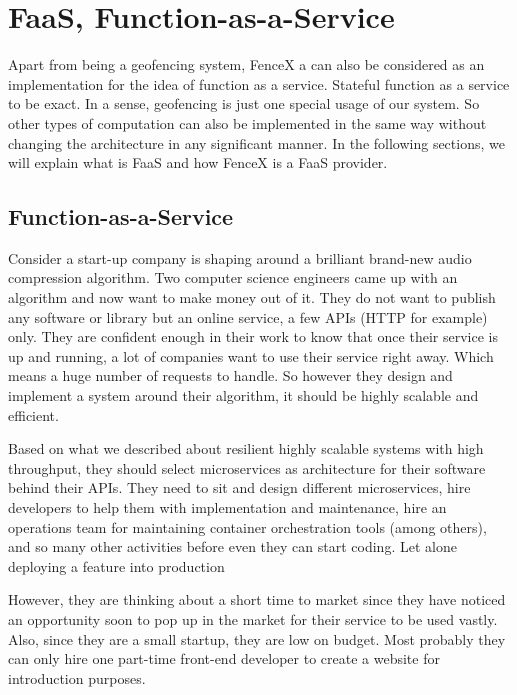 \documentclass[a4]{report}
\begin{document}
    \chapter{FaaS, Function-as-a-Service}
    Apart from being a geofencing system, FenceX a can also be considered as an implementation for the idea of function as
    a service\cite{whatisfaas}.
    Stateful function as a service to be exact.
    In a sense, geofencing is just one special usage of our system.
    So other types of computation can also be implemented in the same way without changing the architecture in any significant manner.
    In the following sections, we will explain what is FaaS and how FenceX is a FaaS provider.


    \section{Function-as-a-Service}
    Consider a start-up company is shaping around a brilliant brand-new audio compression algorithm.
    Two computer science engineers came up with an algorithm and now want to make money out of it.
    They do not want to publish any software or library but an online service, a few APIs (HTTP for example) only.
    They are confident enough in their work to know that once their service is up and running, a lot of companies want to use their service right away.
    Which means a huge number of requests to handle.
    So however they design and implement a system around their algorithm, it should be highly scalable and efficient.

    Based on what we described about resilient highly scalable systems with high throughput, they should select
    microservices as architecture for their software behind their APIs.
    They need to sit and design different microservices, hire developers to help them with implementation and
    maintenance, hire an operations team for maintaining container orchestration tools (among others), and so many
    other activities before even they can start coding.
    Let alone deploying a feature into production

    However, they are thinking about a short time to market since they have noticed an opportunity soon to pop up in
    the market for their service to be used vastly.
    Also, since they are a small startup, they are low on budget.
    Most probably they can only hire one part-time front-end developer to create a website for introduction purposes.
\end{document}
